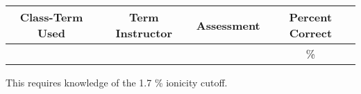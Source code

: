 \begin{outcomes}
	\begin{center}
		\begin{tabular}{cccc}
			\hline\hline
			Class-Term Used & Term Instructor & Assessment & Percent Correct\\
			\hline
			 &  &  & \%\\    %
			\hline
		\end{tabular}
	\end{center}
\end{outcomes}

\begin{comments}

This requires knowledge of the 1.7 \% ionicity cutoff.
	
\end{comments}